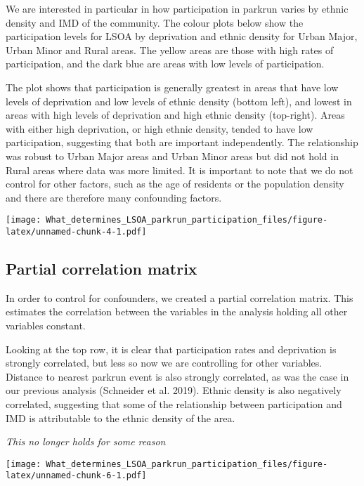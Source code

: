 \documentclass[]{article}
\begin{document}
We are interested in particular in how participation in parkrun varies
by ethnic density and IMD of the community. The colour plots below show
the participation levels for LSOA by deprivation and ethnic density for
Urban Major, Urban Minor and Rural areas. The yellow areas are those
with high rates of participation, and the dark blue are areas with low
levels of participation.

The plot shows that participation is generally greatest in areas that
have low levels of deprivation and low levels of ethnic density (bottom
left), and lowest in areas with high levels of deprivation and high
ethnic density (top-right). Areas with either high deprivation, or high
ethnic density, tended to have low participation, suggesting that both
are important independently. The relationship was robust to Urban Major
areas and Urban Minor areas but did not hold in Rural areas where data
was more limited. It is important to note that we do not control for
other factors, such as the age of residents or the population density
and there are therefore many confounding factors.

\texttt{[image: What\_determines\_LSOA\_parkrun\_participation\_files/figure-latex/unnamed-chunk-4-1.pdf]}

\newpage

\hypertarget{partial-correlation-matrix}{%
\subsection{Partial correlation
matrix}\label{partial-correlation-matrix}}

In order to control for confounders, we created a partial correlation
matrix. This estimates the correlation between the variables in the
analysis holding all other variables constant.

Looking at the top row, it is clear that participation rates and
deprivation is strongly correlated, but less so now we are controlling
for other variables. Distance to nearest parkrun event is also strongly
correlated, as was the case in our previous analysis (Schneider et al.
2019). Ethnic density is also negatively correlated, suggesting that
some of the relationship between participation and IMD is attributable
to the ethnic density of the area.

\emph{This no longer holds for some reason}

\texttt{[image: What\_determines\_LSOA\_parkrun\_participation\_files/figure-latex/unnamed-chunk-6-1.pdf]}
\end{document}
